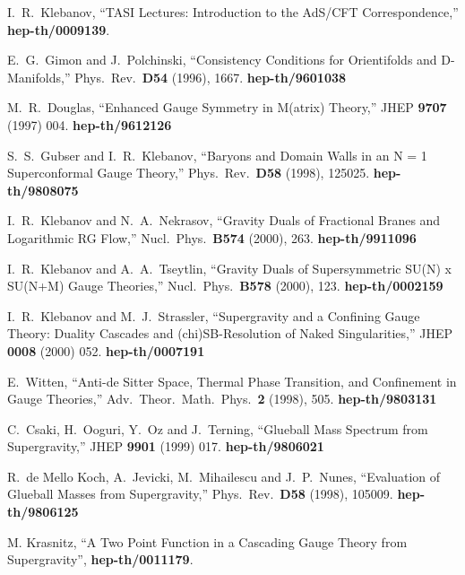\documentclass[12pt,epsf,a4paper]{article}
\begin{document}
\begin{thebibliography}{99}
I.~R.~Klebanov,
``TASI Lectures: Introduction to the AdS/CFT Correspondence,''
{\bf hep-th/0009139}.

E.~G.~Gimon and J.~Polchinski,
``Consistency Conditions for Orientifolds and D-Manifolds,''
Phys.\ Rev.\  {\bf D54} (1996), 1667.
{\bf hep-th/9601038}

M.~R.~Douglas,
``Enhanced Gauge Symmetry in M(atrix) Theory,''
JHEP {\bf 9707} (1997) 004.
{\bf hep-th/9612126}

S.~S.~Gubser and I.~R.~Klebanov,
``Baryons and Domain Walls in an N = 1 Superconformal Gauge Theory,''
Phys.\ Rev.\  {\bf D58} (1998), 125025.
{\bf hep-th/9808075}

I.~R.~Klebanov and N.~A.~Nekrasov,
``Gravity Duals of Fractional Branes and Logarithmic RG Flow,''
Nucl.\ Phys.\  {\bf B574} (2000), 263.
{\bf hep-th/9911096}

I.~R.~Klebanov and A.~A.~Tseytlin,
``Gravity Duals of Supersymmetric SU(N) x SU(N+M) Gauge Theories,''
Nucl.\ Phys.\  {\bf B578} (2000), 123.
{\bf hep-th/0002159}

I.~R.~Klebanov and M.~J.~Strassler,
``Supergravity and a Confining Gauge Theory: Duality Cascades and (chi)SB-Resolution 
of Naked Singularities,''
JHEP {\bf 0008} (2000) 052.
{\bf hep-th/0007191}

E.~Witten,
``Anti-de Sitter Space, Thermal Phase Transition, and Confinement in Gauge Theories,''
Adv.\ Theor.\ Math.\ Phys.\  {\bf 2} (1998), 505.
{\bf hep-th/9803131}

C.~Csaki, H.~Ooguri, Y.~Oz and J.~Terning,
``Glueball Mass Spectrum from Supergravity,''
JHEP {\bf 9901} (1999) 017.
{\bf hep-th/9806021}

R.~de Mello Koch, A.~Jevicki, M.~Mihailescu and J.~P.~Nunes,
``Evaluation of Glueball Masses from Supergravity,''
Phys.\ Rev.\  {\bf D58} (1998), 105009.
{\bf hep-th/9806125}

M. Krasnitz, ``A Two Point Function in a Cascading \coordHE{} Gauge 
Theory from Supergravity'', {\bf hep-th/0011179}.


\end{thebibliography}
\end{document}
